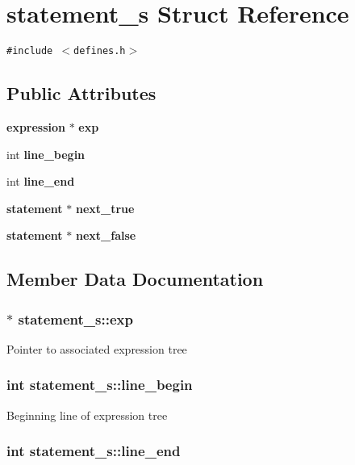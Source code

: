 \section{statement\_\-s  Struct Reference}
\label{structstatement__s}
{\tt \#include $<$defines.h$>$}

\subsection*{Public Attributes}
\begin{CompactItemize}
\item 
{\bf expression} $\ast$ {\bf exp}
\item 
int {\bf line\_\-begin}
\item 
int {\bf line\_\-end}
\item 
{\bf statement} $\ast$ {\bf next\_\-true}
\item 
{\bf statement} $\ast$ {\bf next\_\-false}
\end{CompactItemize}


\subsection{Member Data Documentation}
\subsubsection{$\ast$ statement\_\-s::exp}\label{structstatement__s_m0}


Pointer to associated expression tree 
\subsubsection{\setlength{\rightskip}{0pt plus 5cm}int statement\_\-s::line\_\-begin}\label{structstatement__s_m1}


Beginning line of expression tree 
\subsubsection{\setlength{\rightskip}{0pt plus 5cm}int statement\_\-s::line\_\-end}\label{structstatement__s_m2}


